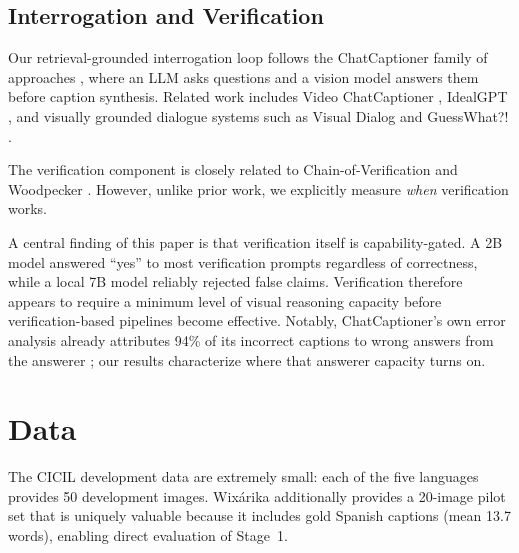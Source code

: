 \documentclass[11pt]{article}
\begin{document}
\subsection{Interrogation and Verification}
Our retrieval-grounded interrogation loop follows the ChatCaptioner family of
approaches \citep{zhu2023chatcaptioner}, where an LLM asks questions and a
vision model answers them before caption synthesis. Related work includes
Video ChatCaptioner \citep{chen2023videochatcaptioner}, IdealGPT
\citep{you2023idealgpt}, and visually grounded dialogue systems such as
Visual Dialog \citep{das2017visualdialog} and GuessWhat?!
\citep{devries2017guesswhat}.

The verification component is closely related to Chain-of-Verification
\citep{dhuliawala2024cove} and Woodpecker \citep{yin2023woodpecker}. However,
unlike prior work, we explicitly measure \emph{when} verification works.

A central finding of this paper is that verification itself is
capability-gated. A 2B model answered ``yes'' to most verification prompts
regardless of correctness, while a local 7B model reliably rejected false
claims. Verification therefore appears to require a minimum level of visual
reasoning capacity before verification-based pipelines become effective.
Notably, ChatCaptioner's own error analysis already attributes 94\% of its
incorrect captions to wrong answers from the answerer
\citep{zhu2023chatcaptioner}; our results characterize where that answerer
capacity turns on.

\section{Data}
The CICIL development data are extremely small: each of the five languages
provides 50 development images. Wixárika additionally provides a 20-image
pilot set that is uniquely valuable because it includes gold Spanish
captions (mean 13.7 words), enabling direct evaluation of Stage~1.
\end{document}
